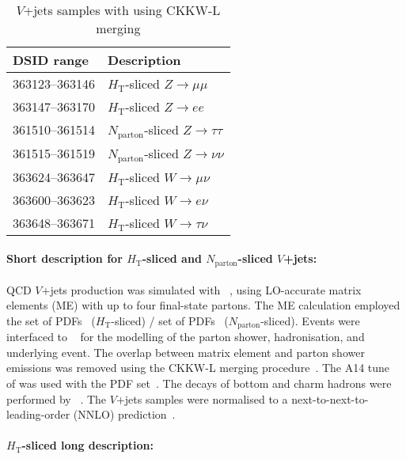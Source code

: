 \begin{table}[!htbp]
\begin{center}
\caption{$V$+jets samples with \MGPY[8] using CKKW-L merging} \label{tab:vjets-mg5py8_ckkwl}
\begin{tabular}{ l | l }
\hline
DSID range & Description \\
\hline
363123--363146 & $H_\text{T}$-sliced $Z\to\mu\mu$   \\
363147--363170 & $H_\text{T}$-sliced $Z\to ee$     \\
361510--361514 & $N_\text{parton}$-sliced $Z\to\tau\tau$ \\
361515--361519 & $N_\text{parton}$-sliced $Z\to\nu\nu$   \\
363624--363647 & $H_\text{T}$-sliced $W\to \mu\nu$   \\
363600--363623 & $H_\text{T}$-sliced $W\to e\nu$    \\
363648--363671 & $H_\text{T}$-sliced $W\to\tau\nu$  \\
\hline
\end{tabular}
\end{center}
\end{table}

\paragraph{Short description for $H_\text{T}$-sliced and $N_\text{parton}$-sliced $V$+jets:}

QCD $V$+jets production was simulated with \MGNLO[2.2.2]~\cite{Alwall:2014hca}, 
using LO-accurate matrix elements (ME) with up to four final-state partons. 
The ME calculation employed the \NNPDF[3.0nlo] set of PDFs~\cite{Ball:2014uwa} 
($H_\text{T}$-sliced) / \NNPDF[2.3lo] set of PDFs~\cite{Ball:2012cx} ($N_\text{parton}$-sliced). 
Events were interfaced to \PYTHIA[8.186]~\cite{Sjostrand:2007gs} for the modelling
of the parton shower, hadronisation, and  underlying event. The overlap between
matrix element and parton shower emissions was removed using the CKKW-L
merging procedure~\cite{Lonnblad:2001iq,Lonnblad:2011xx}. The A14 
tune~\cite{ATL-PHYS-PUB-2014-021} of \PYTHIA[8] was used with the
\NNPDF[2.3lo] PDF set~\cite{Ball:2012cx}. 
The decays of bottom and charm
hadrons were performed by \EVTGEN[1.2.0]~\cite{Lange:2001uf}.
The $V$+jets samples were normalised to a next-to-next-to-leading-order (NNLO) 
prediction~\cite{Anastasiou:2003ds}.
 

\paragraph{$H_\text{T}$-sliced long description:}

